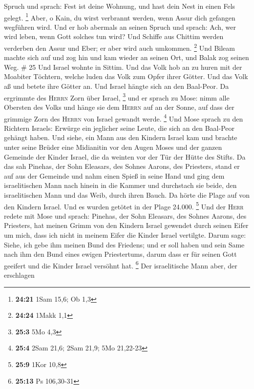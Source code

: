 Spruch und sprach: Fest ist deine Wohnung, und hast dein Nest in einen
Fels gelegt. \footnote{\textbf{24:21} 1Sam 15,6; Ob 1,3} 
Aber, o Kain, du wirst verbrannt werden, wenn Assur dich gefangen
wegführen wird.  Und er hob abermals an seinen Spruch und
sprach: Ach, wer wird leben, wenn Gott solches tun wird? 
Und Schiffe aus Chittim werden verderben den Assur und Eber; er aber
wird auch umkommen. \footnote{\textbf{24:24} 1Makk 1,1} 
Und Bileam machte sich auf und zog hin und kam wieder an seinen Ort, und
Balak zog seinen Weg. \# 25  Und Israel wohnte in Sittim.
Und das Volk hob an zu huren mit der Moabiter Töchtern, 
welche luden das Volk zum Opfer ihrer Götter. Und das Volk aß und betete
ihre Götter an.  Und Israel hängte sich an den Baal-Peor.
Da ergrimmte des \textsc{Herrn} Zorn über Israel, \footnote{\textbf{25:3}
  5Mo 4,3}  und er sprach zu Mose: nimm alle Obersten des
Volks und hänge sie dem \textsc{Herrn} auf an der Sonne, auf dass der
grimmige Zorn des \textsc{Herrn} von Israel gewandt werde. \footnote{\textbf{25:4}
  2Sam 21,6; 2Sam 21,9; 5Mo 21,22-23}  Und Mose sprach zu
den Richtern Israels: Erwürge ein jeglicher seine Leute, die sich an den
Baal-Peor gehängt haben.  Und siehe, ein Mann aus den
Kindern Israel kam und brachte unter seine Brüder eine Midianitin vor
den Augen Moses und der ganzen Gemeinde der Kinder Israel, die da
weinten vor der Tür der Hütte des Stifts.  Da das sah
Pinehas, der Sohn Eleasars, des Sohnes Aarons, des Priesters, stand er
auf aus der Gemeinde und nahm einen Spieß in seine Hand 
und ging dem israelitischen Mann nach hinein in die Kammer und
durchstach sie beide, den israelitischen Mann und das Weib, durch ihren
Bauch. Da hörte die Plage auf von den Kindern Israel.  Und
es wurden getötet in der Plage 24.000. \footnote{\textbf{25:9} 1Kor 10,8}
 Und der \textsc{Herr} redete mit Mose und sprach:
 Pinehas, der Sohn Eleasars, des Sohnes Aarons, des
Priesters, hat meinen Grimm von den Kindern Israel gewendet durch seinen
Eifer um mich, dass ich nicht in meinem Eifer die Kinder Israel
vertilgte.  Darum sage: Siehe, ich gebe ihm meinen Bund
des Friedens;  und er soll haben und sein Same nach ihm
den Bund eines ewigen Priestertums, darum dass er für seinen Gott
geeifert und die Kinder Israel versöhnt hat. \footnote{\textbf{25:13} Ps
  106,30-31}  Der israelitische Mann aber, der erschlagen
